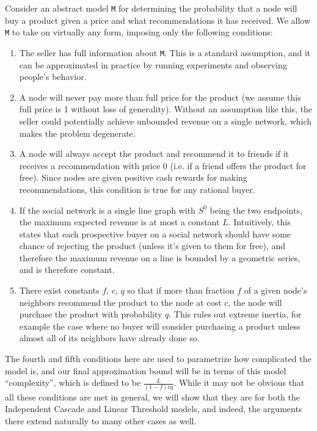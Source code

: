 \documentclass[letterpaper,twoside]{article}
\newcommand{\M}{\texttt{M}}
\begin{document}
Consider an abstract model \M{} for determining the probability
that a node will buy a product given a price and what
recommendations it has received. We allow \M{} to take on virtually any
form, imposing only the following conditions:
\begin{enumerate}
    \item The seller has full information about \M. This is a standard assumption, and
    it can be approximated in practice by running experiments and
    observing people's behavior.
    \item A node will never pay more than full price for the product
    (we assume this full price is 1 without loss of generality). Without an
    assumption like this, the seller could potentially achieve
    unbounded revenue on a single network, which makes the
    problem degenerate.
    \item A node will always accept the product and recommend it to
    friends if it receives a recommendation with price 0 (i.e. if a friend
    offers the product for free). Since nodes are given positive cash rewards
    for making recommendations, this condition is true for any rational buyer.
    \item If the social network is a single line graph with $S^0$ being the
    two endpoints, the maximum expected revenue is at most a constant $L$.
    Intuitively, this states that each prospective buyer on a social network should have
    some chance of rejecting the product (unless it's given to them for free),
    and therefore the maximum revenue on a line is bounded by a geometric series, and
    is therefore constant.
    \item There exist constants $f$, $c$, $q$ so that if more than
    fraction $f$ of a given node's neighbors recommend the product to the
    node at cost $c$, the node will purchase the product with
    probability $q$. This rules out extreme inertia, for example the case where no buyer will consider
    purchasing a product unless almost all of its neighbors have already done so.
\end{enumerate}
The fourth and fifth conditions here are used to parametrize how complicated
the model is, and our final approximation bound will be in terms of this model
``complexity'', which is defined to be $\frac{L}{(1-f)cq}$. While it may not
be obvious that all these conditions are met in general, we will show that they
are for both the Independent Cascade and Linear Threshold models, and indeed,
the arguments there extend naturally to many other cases as well.
\end{document}
